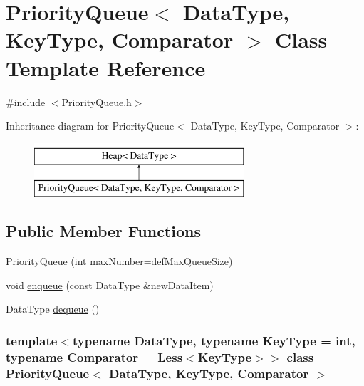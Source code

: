 \hypertarget{class_priority_queue}{\section{\-Priority\-Queue$<$ \-Data\-Type, \-Key\-Type, \-Comparator $>$ \-Class \-Template \-Reference}
\label{class_priority_queue}
}


{\ttfamily \#include $<$\-Priority\-Queue.\-h$>$}

\-Inheritance diagram for \-Priority\-Queue$<$ \-Data\-Type, \-Key\-Type, \-Comparator $>$\-:\begin{figure}[H]
\begin{center}
\leavevmode
\includegraphics[height=2.000000cm]{class_priority_queue}
\end{center}
\end{figure}
\subsection*{\-Public \-Member \-Functions}
\begin{DoxyCompactItemize}
\item 
\hyperlink{class_priority_queue_a47de2a46cff1d6a6ed30a99c94dc1b14}{\-Priority\-Queue} (int max\-Number=\hyperlink{_priority_queue_8h_a88703212007be018800be64f2f5fde2f}{def\-Max\-Queue\-Size})
\item 
void \hyperlink{class_priority_queue_a61f3339cf0e87c67ed004f8eff0a1bfa}{enqueue} (const \-Data\-Type \&new\-Data\-Item)
\item 
\-Data\-Type \hyperlink{class_priority_queue_a5bc758e313d6244e672ea6e81d695a46}{dequeue} ()
\end{DoxyCompactItemize}
\subsubsection*{template$<$typename Data\-Type, typename Key\-Type = int, typename Comparator = \-Less$<$\-Key\-Type$>$$>$ class Priority\-Queue$<$ Data\-Type, Key\-Type, Comparator $>$}



